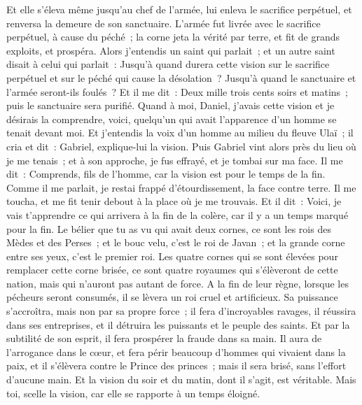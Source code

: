 \begin{multicols}{2}
Et elle s'éleva même jusqu'au chef de l'armée, lui enleva le sacrifice perpétuel, et renversa la demeure de son sanctuaire.
L'armée fut livrée avec le sacrifice perpétuel, à cause du péché~; la corne jeta la vérité par terre, et fit de grands exploits, et prospéra.
Alors j'entendis un saint qui parlait~; et un autre saint disait à celui qui parlait~: Jusqu'à quand durera cette vision sur le sacrifice perpétuel et sur le péché qui cause la désolation~? Jusqu'à quand le sanctuaire et l'armée seront-ils foulés~?
Et il me dit~: Deux mille trois cents soirs et matins~; puis le sanctuaire sera purifié.
Quand à moi, Daniel, j'avais cette vision et je désirais la comprendre, voici, quelqu'un qui avait l'apparence d'un homme se tenait devant moi.
Et j'entendis la voix d'un homme au milieu du fleuve Ulaï~; il cria et dit~: Gabriel, explique-lui la vision.
Puis Gabriel vint alors près du lieu où je me tenais~; et à son approche, je fus effrayé, et je tombai sur ma face. Il me dit~: Comprends, fils de l'homme, car la vision est pour le temps de la fin.
Comme il me parlait, je restai frappé d'étourdissement, la face contre terre. Il me toucha, et me fit tenir debout à la place où je me trouvais.
Et il dit~: Voici, je vais t'apprendre ce qui arrivera à la fin de la colère, car il y a un temps marqué pour la fin.
Le bélier que tu as vu qui avait deux cornes, ce sont les rois des Mèdes et des Perses~;
et le bouc velu, c'est le roi de Javan~; et la grande corne entre ses yeux, c'est le premier roi.
Les quatre cornes qui se sont élevées pour remplacer cette corne brisée, ce sont quatre royaumes qui s'élèveront de cette nation, mais qui n'auront pas autant de force.
A la fin de leur règne, lorsque les pécheurs seront consumés, il se lèvera un roi cruel et artificieux.
Sa puissance s'accroîtra, mais non par sa propre force~; il fera d'incroyables ravages, il réussira dans ses entreprises, et il détruira les puissants et le peuple des saints.
Et par la subtilité de son esprit, il fera prospérer la fraude dans sa main. Il aura de l'arrogance dans le cœur, et fera périr beaucoup d'hommes qui vivaient dans la paix, et il s'élèvera contre le Prince des princes~; mais il sera brisé, sans l'effort d'aucune main.
Et la vision du soir et du matin, dont il s'agit, est véritable. Mais toi, scelle la vision, car elle se rapporte à un temps éloigné.

\end{multicols}
